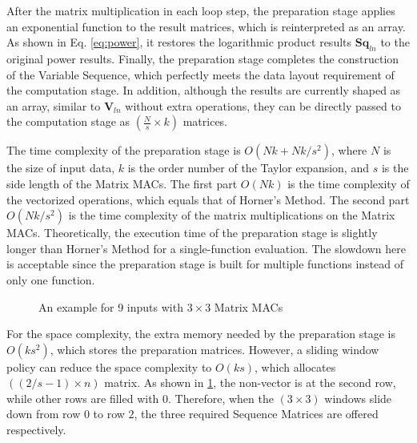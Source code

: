 \documentclass[12pt]{extbook}
\begin{document}
After the matrix multiplication in each loop step, the preparation stage applies an exponential function to the result matrices, which is reinterpreted as an array. As shown in Eq. \ref{eq:power}, it restores the logarithmic product results $\textbf{Sq}_{ln}$ to the original power results. Finally, the preparation stage completes the construction of the Variable Sequence, which perfectly meets the data layout requirement of the computation stage. In addition, although the results are currently shaped as an array, similar to $\textbf{V}_{ln}$ without extra operations, they can be directly passed to the computation stage as $(\frac{N}{s} \times k)$ matrices.

The time complexity of the preparation stage is $O(Nk + Nk / s^2)$, where $N$ is the size of input data, $k$ is the order number of the Taylor expansion, and $s$ is the side length of the Matrix MACs. The first part $O(Nk)$ is the time complexity of the vectorized operations, which equals that of Horner's Method. The second part $O(Nk / s^2)$ is the time complexity of the matrix multiplications on the Matrix MACs. Theoretically, the execution time of the preparation stage is slightly longer than Horner's Method for a single-function evaluation. The slowdown here is acceptable since the preparation stage is built for multiple functions instead of only one function.

\begin{figure}[t]
    \caption{An example for 9 inputs with $3 \times 3$ Matrix MACs}
    \label{fig:window}
    \end{figure}

For the space complexity, the extra memory needed by the preparation stage is $O(ks^2)$, which stores the preparation matrices. However, a sliding window policy can reduce the space complexity to $O(ks)$, which allocates $((2/s - 1) \times n)$ matrix. As shown in \ref{fig:window}, the non-vector is at the second row, while other rows are filled with $0$. Therefore, when the $(3 \times 3)$ windows slide down from row $0$ to row $2$, the three required Sequence Matrices are offered respectively.
\end{document}
